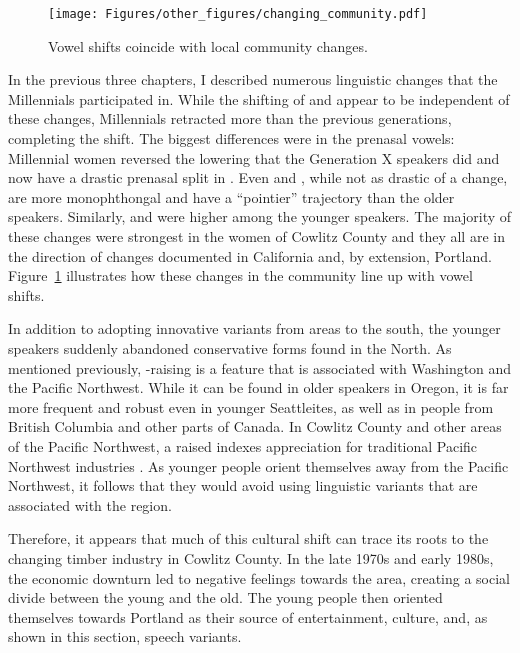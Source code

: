 \begin{figure}[tb!]
    \centering
    \texttt{[image: Figures/other\_figures/changing\_community.pdf]}
    \caption{Vowel shifts coincide with local community changes.}
    \label{fig:changing_community}
\end{figure}

In the previous three chapters, I described numerous linguistic changes that the Millennials participated in. While the shifting of \bat and \bet appear to be independent of these changes, Millennials retracted \bit more than the previous generations, completing the shift. The biggest differences were in the prenasal vowels: Millennial women reversed the \ban lowering that the Generation X speakers did and now have a drastic prenasal split in \trap. Even \ben and \bin, while not as drastic of a change, are more monophthongal and have a ``pointier'' trajectory than the older speakers. Similarly, \bang and \bing were higher among the younger speakers. The majority of these changes were strongest in the women of Cowlitz County and they all are in the direction of changes documented in California and, by extension, Portland. Figure~\ref{fig:changing_community} illustrates how these changes in the community line up with vowel shifts.

In addition to adopting innovative variants from areas to the south, the younger speakers suddenly abandoned conservative forms found in the North. As mentioned previously, \bag-raising is a feature that is associated with Washington and the Pacific Northwest. While it can be found in older speakers in Oregon, it is far more frequent and robust even in younger Seattleites, as well as in people from British Columbia and other parts of Canada. In Cowlitz County and other areas of the Pacific Northwest, a raised \bag indexes appreciation for traditional Pacific Northwest industries \citep{swan_2018_CWSL, stanley_2018_pwpl}. As younger people orient themselves away from the Pacific Northwest, it follows that they would avoid using linguistic variants that are associated with the region.

Therefore, it appears that much of this cultural shift can trace its roots to the changing timber industry in Cowlitz County. In the late 1970s and early 1980s, the economic downturn led to negative feelings towards the area, creating a social divide between the young and the old. The young people then oriented themselves towards Portland as their source of entertainment, culture, and, as shown in this section, speech variants.





